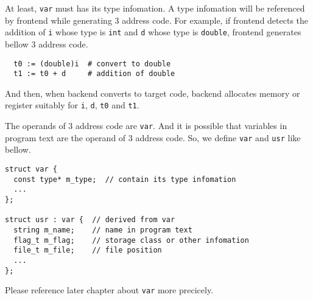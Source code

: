 At least, {\tt{var}} must has its type infomation.
A type infomation will be referenced by frontend while generating
3 address code. For example, if frontend detects the addition of
{\tt{i}} whose type is {\tt{int}} and {\tt{d}} whose type is
{\tt{double}}, frontend generates bellow 3 address code.
\begin{verbatim}
  t0 := (double)i  # convert to double
  t1 := t0 + d     # addition of double
\end{verbatim}
And then, when backend converts to target code,
backend allocates memory or register suitably for
{\tt{i}}, {\tt{d}}, {\tt{t0}} and {\tt{t1}}.

The operands of 3 address code are {\tt{var}}. And it is
possible that variables in program text are the operand of 3 address code.
So, we define {\tt{var}} and {\tt{usr}} like bellow.
\begin{verbatim}
struct var {
  const type* m_type;  // contain its type infomation
  ...
};

struct usr : var {  // derived from var
  string m_name;    // name in program text
  flag_t m_flag;    // storage class or other infomation
  file_t m_file;    // file position
  ...
};
\end{verbatim}
Please reference later chapter about {\tt{var}} more
precicely.

